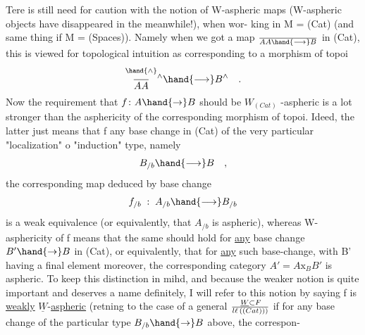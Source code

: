 Tere is still need for caution with the  notion of W-aspheric
maps (W-aspheric objects have disappeared in the meanwhile!),  when wor-%
king in M = (Cat)  (and same thing if M = (Spaces)).  Namely when we got
a map  $\over{A}{A} \hand{\longrightarrow} B$ in (Cat),  this is viewed for topological intuition as
corresponding to a morphism of topoi
\[ \overset{\hand{\wedge}}{\over{A}{A}}{}^{\wedge} \hand{\longrightarrow} B^{\wedge} \quad . \]
Now the requirement that  $f\colon A \hand{\to} B$ should be $W_{(Cat)}$ -aspheric  is a lot
stronger than the asphericity of the corresponding morphism of topoi.
Ideed,  the latter just means that f any base change  in (Cat) of
the very particular "localization" o "induction" type,  namely
\[ B_{/b} \hand{\longrightarrow} B \quad , \]
the corresponding map deduced by base change
\[ f_{/b} \;:\; A_{/b} \hand{\longrightarrow} B_{/b} \]
is a weak equivalence (or equivalently,  that $A_{/b}$ is aspheric),  whereas
W-asphericity of f means that the same should hold for \uline{any} base change
$B' \hand{\to} B$ in (Cat),  or equivalently,  that for \uline{any} such base-change,  with
B' having a final element moreover,  the corresponding  category
$A'=A\mathrm{x}_B B'$  is aspheric.  To keep this distinction in mihd,  and because
the weaker notion is quite important and deserves a name definitely,
I will refer to this notion by saying f is \uline{weakly} \uline{$\underline{W}$}-\uline{aspheric}  (retning
to the case of a general $\underline{W} \subset F\!\over{l}{\ell}\,((Cat)))$  if 
for any base change of the particular type $B_{/b} \hand{\to} B$ above,  the correspon-%

